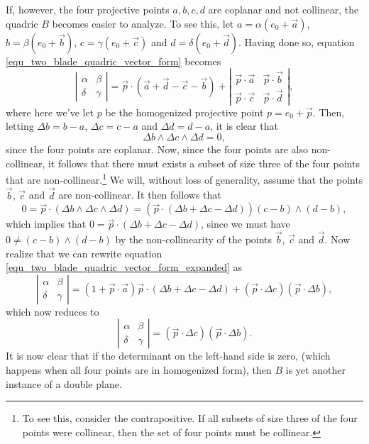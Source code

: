 \documentclass{ecgd-l}
\theoremstyle{definition}
\theoremstyle{remark}
\numberwithin{equation}{section}
\begin{document}
If, however, the four projective points $a,b,c,d$ are
coplanar and not collinear, the quadric $B$ becomes easier to analyze.
To see this, let $a=\alpha(e_0+\vec{a})$, $b=\beta(e_0+\vec{b})$,
$c=\gamma(e_0+\vec{c})$ and $d=\delta(e_0+\vec{d})$.  Having done so, equation \eqref{equ_two_blade_quadric_vector_form}
becomes
\begin{equation}\label{equ_two_blade_quadric_vector_form_expanded}
\left|\begin{array}{cc}
\alpha & \beta \\
\delta & \gamma
\end{array}\right| =
\vec{p}\cdot(\vec{a}+\vec{d}-\vec{c}-\vec{b})+
\left|\begin{array}{cc}
\vec{p}\cdot\vec{a} & \vec{p}\cdot\vec{b} \\
\vec{p}\cdot\vec{c} & \vec{p}\cdot\vec{d}
\end{array}\right|,
\end{equation}
where here we've let $p$ be the homogenized projective point $p=e_0+\vec{p}$.
Then, letting $\Delta b=b-a$, $\Delta c=c-a$ and $\Delta d=d-a$, it is clear that
\begin{equation}
\Delta b\wedge\Delta c\wedge\Delta d = 0,
\end{equation}
since the four points are coplanar.  Now, since the four points are also non-collinear,
it follows that there must exists a subset of size three of the four points that are
non-collinear.\footnote{To see this, consider the contrapositive.  If all subsets
of size three of the four points were collinear, then the set of four points must
be collinear.}  We will, without loss of generality, assume that the points $\vec{b}$,
$\vec{c}$ and $\vec{d}$ are non-collinear.  It then follows that
\begin{equation}
0 = \vec{p}\cdot(\Delta b\wedge\Delta c\wedge\Delta d)
= (\vec{p}\cdot(\Delta b+\Delta c-\Delta d))(c-b)\wedge(d-b),
\end{equation}
which implies that $0=\vec{p}\cdot(\Delta b+\Delta c-\Delta d)$, since we
must have $0\neq (c-b)\wedge(d-b)$ by the non-collinearity of the points
$\vec{b}$, $\vec{c}$ and $\vec{d}$.  Now realize that we can
rewrite equation \eqref{equ_two_blade_quadric_vector_form_expanded} as
\begin{equation}
\left|\begin{array}{cc}
\alpha & \beta \\
\delta & \gamma
\end{array}\right| =
(1+\vec{p}\cdot\vec{a})\vec{p}\cdot(\Delta b+\Delta c-\Delta d) + (\vec{p}\cdot\Delta c)(\vec{p}\cdot\Delta b),
\end{equation}
which now reduces to
\begin{equation}
\left|\begin{array}{cc}
\alpha & \beta \\
\delta & \gamma
\end{array}\right| = (\vec{p}\cdot\Delta c)(\vec{p}\cdot\Delta b).
\end{equation}
It is now clear that if the determinant on the left-hand side is zero, (which
happens when all four points are in homogenized form), then $B$ is yet
another instance of a double plane.
\end{document}

